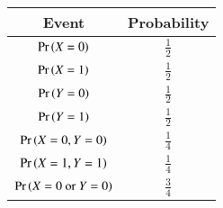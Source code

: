 
\begin{center}
\begin{tabular}{|c|c|}
\hline
\textbf{Event}& \textbf{Probability} \\ \hline
$\Pr\left(X = 0\right)$ &  $\frac{1}{2}$ \\ \hline
$\Pr\left(X = 1\right)$ &  $\frac{1}{2}$ \\ \hline
$\Pr\left(Y = 0\right)$ &  $\frac{1}{2}$ \\ \hline
$\Pr\left(Y = 1\right)$ &  $\frac{1}{2}$ \\ \hline
$\Pr\left(X = 0, Y = 0\right)$ & 	$\frac{1}{4}$ \\ \hline
$\Pr\left(X = 1, Y = 1\right)$ & 	$\frac{1}{4}$ \\ \hline
$\Pr\left(X = 0 \text{ or } Y = 0\right)$ & 	$\frac{3}{4}$ \\ \hline
\end{tabular}
\end{center}
